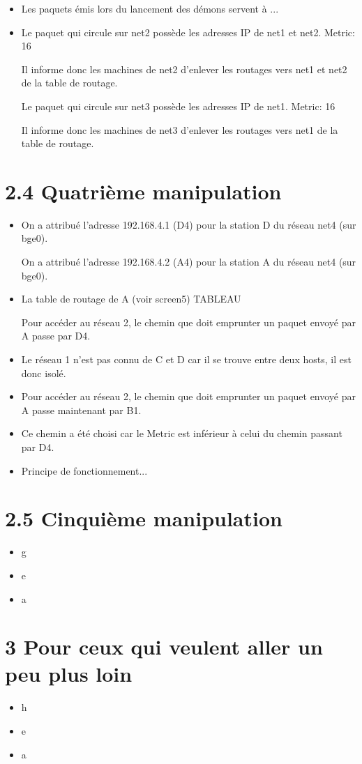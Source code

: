 \documentclass{article}
\begin{document}
\begin{itemize}\renewcommand{\labelitemi}{$\bullet$}
\item Les paquets émis lors du lancement des démons servent à ...
\item Le paquet qui circule sur net2 possède les adresses IP de net1 et net2. Metric: 16

Il informe donc les machines de net2 d'enlever les routages vers net1 et net2 de la table de routage.

Le paquet qui circule sur net3 possède les adresses IP de net1. Metric: 16

Il informe donc les machines de net3 d'enlever les routages vers net1 de la table de routage.
\end{itemize}


\section*{2.4 Quatrième manipulation}

\begin{itemize}\renewcommand{\labelitemi}{$\bullet$}
\item On a attribué l'adresse 192.168.4.1 (D4) pour la station D du réseau net4 (sur bge0).

On a attribué l'adresse 192.168.4.2 (A4) pour la station A du réseau net4 (sur bge0).
\item La table de routage de A (voir screen5) TABLEAU

Pour accéder au réseau 2, le chemin que doit emprunter un paquet envoyé par A passe par D4.
\item Le réseau 1 n'est pas connu de C et D car il se trouve entre deux hosts, il est donc isolé.

\item Pour accéder au réseau 2, le chemin que doit emprunter un paquet envoyé par A passe maintenant par B1.

\item Ce chemin a été choisi car le Metric est inférieur à celui du chemin passant par D4.

\item Principe de fonctionnement...
\end{itemize}


\section*{2.5 Cinquième manipulation}

\begin{itemize}\renewcommand{\labelitemi}{$\bullet$}
\item g
\item e
\item a
\end{itemize}


\section*{3 Pour ceux qui veulent aller un peu plus loin}

\begin{itemize}\renewcommand{\labelitemi}{$\bullet$}
\item h
\item e
\item a
\end{itemize}
\end{document}
